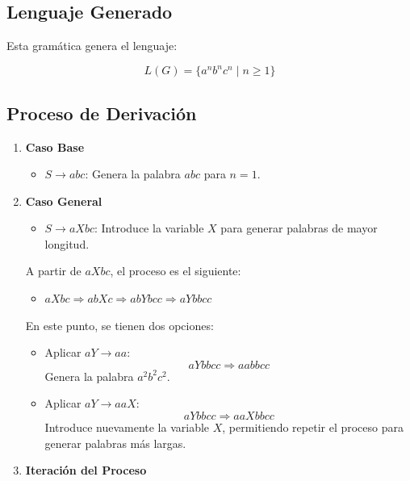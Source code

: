 \documentclass[12pt]{report} %
\providecommand{\tightlist}{%
  \setlength{\itemsep}{0pt}\setlength{\parskip}{0pt}}
\begin{document}
\hypertarget{lenguaje-generado-1}{%
\subsection{Lenguaje Generado}\label{lenguaje-generado-1}}

Esta gramática genera el lenguaje:

\[
L(G) = \{a^n b^n c^n \mid n \geq 1\}
\]

\hypertarget{proceso-de-derivaciuxf3n}{%
\subsection{Proceso de Derivación}\label{proceso-de-derivaciuxf3n}}

\begin{enumerate}
\def\labelenumi{\arabic{enumi}.}
\tightlist
\item
  \textbf{Caso Base}

  \begin{itemize}
  \tightlist
  \item
    \(S \to abc\): Genera la palabra \(abc\) para \(n = 1\).
  \end{itemize}
\item
  \textbf{Caso General}

  \begin{itemize}
  \tightlist
  \item
    \(S \to aXbc\): Introduce la variable \(X\) para generar palabras de
    mayor longitud.
  \end{itemize}

  A partir de \(aXbc\), el proceso es el siguiente:

  \begin{itemize}
  \tightlist
  \item
    \(aXbc \Rightarrow abXc \Rightarrow abYbcc \Rightarrow aYbbcc\)
  \end{itemize}

  En este punto, se tienen dos opciones:

  \begin{itemize}
  \item
    Aplicar \(aY \to aa\):\\
    \[
    aYbbcc \Rightarrow aabbcc
    \] Genera la palabra \(a^2b^2c^2\).
  \item
    Aplicar \(aY \to aaX\):\\
    \[
    aYbbcc \Rightarrow aaXbbcc
    \] Introduce nuevamente la variable \(X\), permitiendo repetir el
    proceso para generar palabras más largas.
  \end{itemize}
\item
  \textbf{Iteración del Proceso}


\end{enumerate}
\end{document}
